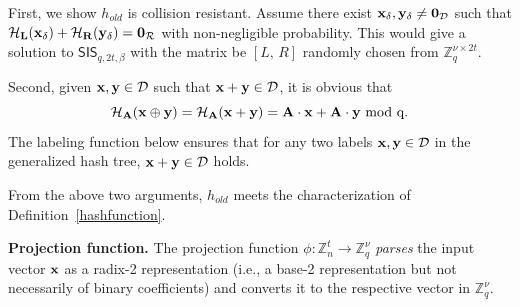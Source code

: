First, we show $h_{old}$ is collision resistant. Assume there exist $\bf x_{\delta}, y_{\delta} \neq 0_{\mathcal{D}}$ such that $\bf {\cal H}_{L}(x_{\delta}) + {\cal H}_{R}(y_{\delta})= {\bf 0}_{\mathcal{R}}$ with non-negligible probability. This would give a solution to $\mathsf{SIS}_{q, 2t,\beta}$ with the matrix be $[L,\, R]$ randomly chosen from $\mathbb{Z}_q^{\nu \times 2t}$. 



Second, given ${\bf x, y} \in {\mathcal{D}}$ such that ${\bf x + y} \in {\mathcal{D}}$, it is obvious that $${\bf {\cal H}_{A}(x \oplus y)} = {\bf {\cal H}_{A}(x + y)} = {\bf A \cdot x} + {\bf A \cdot y} \text{  mod q}.$$The labeling function below ensures that for any two labels ${\bf x, y} \in {\mathcal{D}}$ in the generalized hash tree, ${\bf x + y} \in {\mathcal{D}}$ holds. 

From the above two arguments, $h_{old}$ meets the characterization of Definition~\ref{hashfunction}.

{\bf Projection function.}
The projection function $\phi: \mathbb{Z}_n^{t} \rightarrow \mathbb{Z}_q^\nu$ \emph{parses} the input vector $\textbf{x}$ as a radix-2 representation (i.e., a base-2 representation but not necessarily of binary coefficients) and converts it to the respective vector in $\mathbb{Z}_q^\nu$. 

